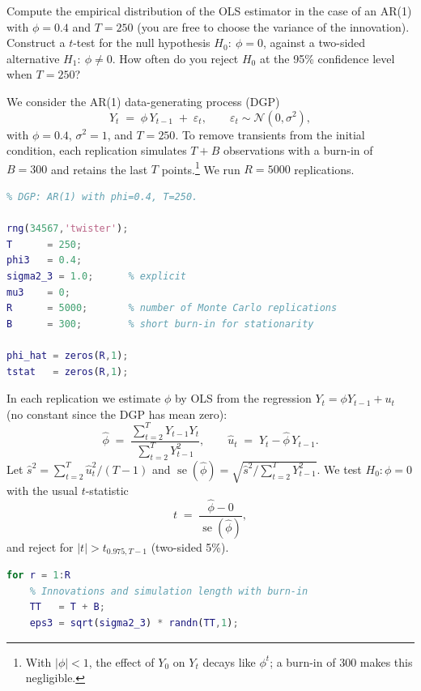 \documentclass[dvipsnames,11pt]{article}
\begin{document}
    Compute the empirical distribution of the OLS estimator in the case of an AR(1) with $\phi=0.4$ and $T=250$ (you are free to choose the variance of the innovation). Construct a $t$-test for the null hypothesis $H_0:\ \phi=0$, against a two-sided alternative $H_1:\ \phi\neq 0$. How often do you reject $H_0$ at the 95\% confidence level when $T=250$?

    \begin{solution}

        We consider the AR(1) data-generating process (DGP)
        \begin{equation}
            Y_t \;=\; \phi\,Y_{t-1} \;+\; \varepsilon_t, \qquad \varepsilon_t \sim \mathcal{N}(0,\sigma^2), 
        \end{equation}
        with $\phi=0.4$, $\sigma^2=1$, and $T=250$. To remove transients from the initial condition, each replication simulates $T+B$ observations with a burn-in of $B=300$ and retains the last $T$ points.\footnote{With $|\phi|<1$, the effect of $Y_0$ on $Y_t$ decays like $\phi^t$; a burn-in of 300 makes this negligible.} We run $R=5000$ replications.

\begin{lstlisting}[language=Matlab]
% Empirical distribution of OLS estimator; t-test of H0: phi=0
% DGP: AR(1) with phi=0.4, T=250.

rng(34567,'twister');
T      = 250;
phi3   = 0.4;
sigma2_3 = 1.0;      % explicit
mu3    = 0;
R      = 5000;       % number of Monte Carlo replications
B      = 300;        % short burn-in for stationarity

phi_hat = zeros(R,1);
tstat   = zeros(R,1);
\end{lstlisting}

        In each replication we estimate $\phi$ by OLS from the regression $Y_t=\phi Y_{t-1}+u_t$ (no constant since the DGP has mean zero):
        \[
          \widehat\phi \;=\; 
          \frac{\sum_{t=2}^T Y_{t-1}Y_t}{\sum_{t=2}^T Y_{t-1}^2},
          \qquad 
          \widehat u_t \;=\; Y_t-\widehat\phi\,Y_{t-1}.
        \]
        Let $\widehat s^2=\sum_{t=2}^T \widehat u_t^2/(T-1)$ and
        $\operatorname{se}(\widehat\phi)=\sqrt{\widehat s^2/\sum_{t=2}^T Y_{t-1}^2}$.
        We test $H_0\!:\phi=0$ with the usual $t$-statistic
        \[
          t \;=\; \frac{\widehat\phi-0}{\operatorname{se}(\widehat\phi)},
        \]
        and reject for $|t|>t_{0.975,T-1}$ (two-sided 5\%).

\begin{lstlisting}[language=Matlab]
for r = 1:R
    % Innovations and simulation length with burn-in
    TT   = T + B;
    eps3 = sqrt(sigma2_3) * randn(TT,1);


\end{lstlisting}
\end{solution}
\end{document}
